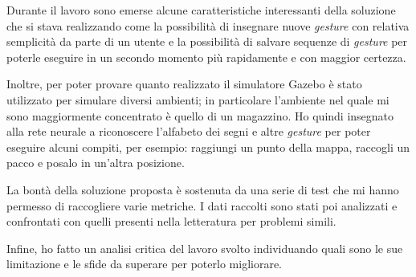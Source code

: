 \documentclass[../thesis.tex]{subfiles}
\begin{document}
Durante il lavoro sono emerse alcune caratteristiche interessanti della soluzione che si stava realizzando come la possibilit\`a di insegnare nuove \textit{gesture} con relativa semplicit\`a da parte di un utente e la possibilit\`a di salvare sequenze di \textit{gesture} per poterle eseguire in un secondo momento pi\`u rapidamente e con maggior certezza. 

Inoltre, per poter provare quanto realizzato il simulatore Gazebo \`e stato utilizzato per simulare diversi ambienti; in particolare l'ambiente nel quale mi sono maggiormente concentrato \`e quello di un magazzino. Ho quindi insegnato alla rete neurale a riconoscere l'alfabeto dei segni e altre \textit{gesture} per poter eseguire alcuni compiti, per esempio: raggiungi un punto della mappa, raccogli un pacco e posalo in un'altra posizione.

La bont\`a della soluzione proposta \`e sostenuta da una serie di test che mi hanno permesso di raccogliere varie metriche. I dati raccolti sono stati poi analizzati e confrontati con quelli presenti nella letteratura per problemi simili.

Infine, ho fatto un analisi critica del lavoro svolto individuando quali sono le sue limitazione e le sfide da superare per poterlo migliorare.
\end{document}
